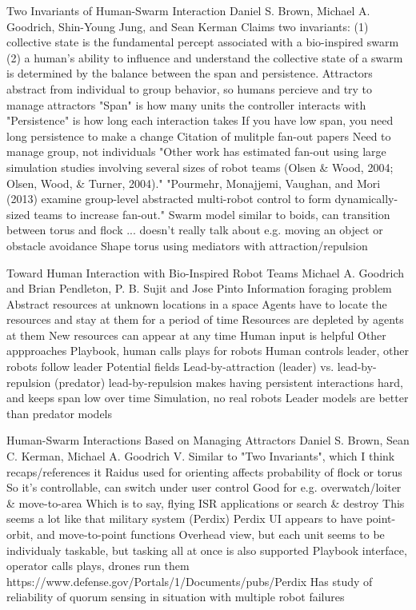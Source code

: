 Two Invariants of Human-Swarm Interaction
Daniel S. Brown, Michael A. Goodrich, Shin-Young Jung, and Sean Kerman
	Claims two invariants:
		(1) collective state is the fundamental percept associated with a bio-inspired swarm
		(2) a human’s ability to influence and understand the collective state of a swarm is determined by the balance between the span and persistence.
	Attractors abstract from individual to group behavior, so humans percieve and try to manage attractors
	"Span" is how many units the controller interacts with
	"Persistence" is how long each interaction takes
		If you have low span, you need long persistence to make a change
	Citation of mulitple fan-out papers
		Need to manage group, not individuals
		"Other work has estimated fan-out using large simulation studies involving several sizes of robot teams (Olsen \& Wood, 2004; Olsen, Wood, \& Turner, 2004)."
		"Pourmehr, Monajjemi, Vaughan, and Mori (2013) examine group-level abstracted multi-robot control to form dynamically-sized teams to increase fan-out."
	Swarm model similar to boids, can transition between torus and flock
		... doesn't really talk about e.g. moving an object or obstacle avoidance
	Shape torus using mediators with attraction/repulsion

Toward Human Interaction with Bio-Inspired Robot Teams
Michael A. Goodrich and Brian Pendleton, P. B. Sujit and Jose Pinto
	Information foraging problem
		Abstract resources at unknown locations in a space
		Agents have to locate the resources and stay at them for a period of time
		Resources are depleted by agents at them
		New resources can appear at any time
		Human input is helpful
	Other appproaches
		Playbook, human calls plays for robots
		Human controls leader, other robots follow leader
		Potential fields
	Lead-by-attraction (leader) vs. lead-by-repulsion (predator)
		lead-by-repulsion makes having persistent interactions hard, and keeps span low over time
	Simulation, no real robots
		Leader models are better than predator models


Human-Swarm Interactions Based on Managing Attractors
Daniel S. Brown, Sean C. Kerman, Michael A. Goodrich
	V. Similar to "Two Invariants", which I think recaps/references it
	Raidus used for orienting affects probability of flock or torus
	So it's controllable, can switch under user control
	Good for e.g. overwatch/loiter \& move-to-area
		Which is to say, flying ISR applications or search \& destroy
	This seems a lot like that military system (Perdix)
		Perdix UI appears to have point-orbit, and move-to-point functions
		Overhead view, but each unit seems to be individualy taskable, but tasking all at once is also supported
			Playbook interface, operator calls plays, drones run them
			https://www.defense.gov/Portals/1/Documents/pubs/Perdix%
	Has study of reliability of quorum sensing in situation with multiple robot failures


